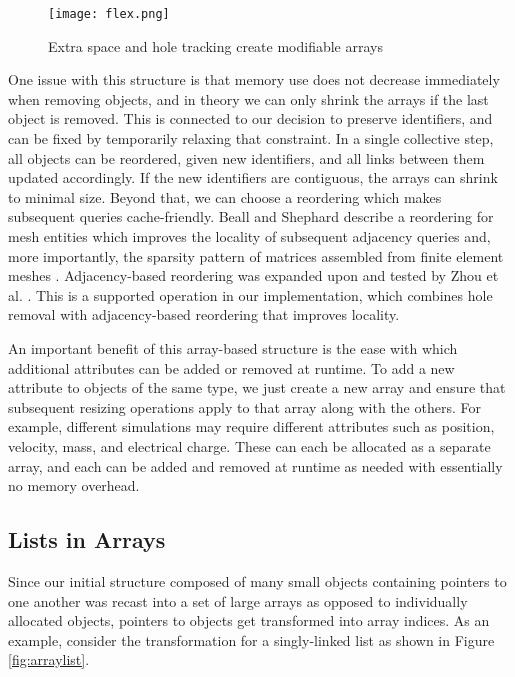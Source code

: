 \begin{figure}
\begin{center}
\texttt{[image: flex.png]}
\caption{Extra space and hole tracking create modifiable arrays}
\label{fig:flex}
\end{center}
\end{figure}

One issue with this structure is that memory use does
not decrease immediately when removing objects, and in theory we can
only shrink the arrays if the last object is removed.
This is connected to our decision to preserve identifiers,
and can be fixed by temporarily relaxing that constraint.
In a single collective step, all objects can be reordered,
given new identifiers, and all links between them updated
accordingly.
If the new identifiers are contiguous, the arrays can shrink
to minimal size.
Beyond that, we can choose a reordering which
makes subsequent queries cache-friendly.
Beall and Shephard describe a reordering for mesh entities which
improves the locality of subsequent adjacency queries
and, more importantly, the sparsity pattern of
matrices assembled from finite element meshes \cite{beall1997general}.
Adjacency-based reordering was expanded upon and
tested by Zhou et al. \cite{zhou2010adjacency}.
This is a supported operation in our implementation,
which combines hole removal with adjacency-based reordering
that improves locality.

An important benefit of this array-based structure is the
ease with which additional attributes can be added or removed
at runtime.
To add a new attribute to objects of the same type, we just
create a new array and ensure that subsequent resizing
operations apply to that array along with the others.
For example, different simulations may require different
attributes such as position, velocity, mass, and electrical charge.
These can each be allocated as a separate array,
and each can be added and removed at runtime as needed
with essentially no memory overhead.

\subsection{Lists in Arrays}
\label{sec:lia}

Since our initial structure composed of many small objects containing pointers
to one another was recast into a set of large arrays
as opposed to individually allocated objects,
pointers to objects get transformed into array indices.
As an example, consider the transformation for a singly-linked
list as shown in Figure \ref{fig:arraylist}.

